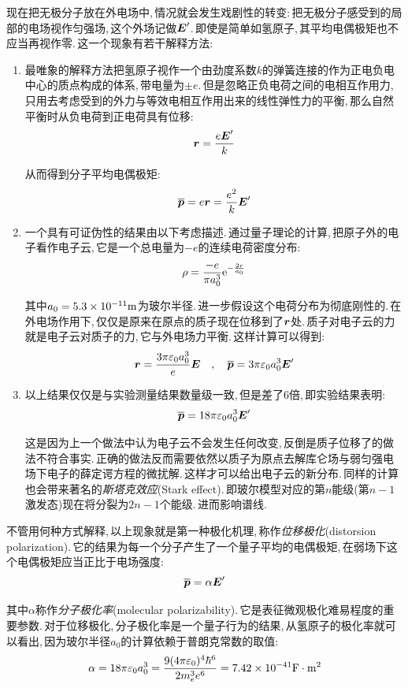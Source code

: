现在把无极分子放在外电场中,\,情况就会发生戏剧性的转变:\,把无极分子感受到的局部的电场视作匀强场,\,这个外场记做$\boldsymbol{E}'$.\,即使是简单如氢原子,\,其平均电偶极矩也不应当再视作零.\,这一个现象有若干解释方法:

\begin{enumerate}
\item 最唯象的解释方法把氢原子视作一个由劲度系数$k$的弹簧连接的作为正电负电中心的质点构成的体系,\,带电量为$\pm e$.\,但是忽略正负电荷之间的电相互作用力,\,只用去考虑受到的外力与等效电相互作用出来的线性弹性力的平衡,\,那么自然平衡时从负电荷到正电荷具有位移:
\[\boldsymbol{r}=\frac{e\boldsymbol{E}'}{k}\]

从而得到分子平均电偶极矩:
\[\overline{\boldsymbol{p}}=e\boldsymbol{r}=\frac{e^2}{k}\boldsymbol{E}'\]

\item 一个具有可证伪性的结果由以下考虑描述.\,通过量子理论的计算,\,把原子外的电子看作电子云,\,它是一个总电量为$-e$的连续电荷密度分布:
$$
\rho =\frac{-e}{\pi a_{0}^{3}}{\rm e}^{-\frac{2r}{a_0}}
$$

其中$a_0=5.3\times 10^{-11}{\rm m}$为玻尔半径.\,进一步假设这个电荷分布为彻底刚性的.\,在外电场作用下,\,仅仅是原来在原点的质子现在位移到了$\boldsymbol{r}$处.\,质子对电子云的力就是电子云对质子的力,\,它与外电场力平衡.\,这样计算可以得到:
\[\boldsymbol{r}=\frac{3\pi\varepsilon_0 a_0^3}{e}\boldsymbol{E}\quad ,\quad \overline{\boldsymbol{p}}=3\pi\varepsilon_0 a_0^3\boldsymbol{E}'\]

\item 以上结果仅仅是与实验测量结果数量级一致,\,但是差了$6$倍,\,即实验结果表明:
\[\overline{\boldsymbol{p}}=18\pi\varepsilon_0 a_0^3\boldsymbol{E}'\]

这是因为上一个做法中认为电子云不会发生任何改变,\,反倒是质子位移了的做法不符合事实.\,正确的做法反而需要依然以质子为原点去解库仑场与弱匀强电场下电子的薛定谔方程的微扰解.\,这样才可以给出电子云的新分布.\,同样的计算也会带来著名的\emph{斯塔克效应}(Stark effect).\,即玻尔模型对应的第$n$能级(第$n-1$激发态)现在将分裂为$2n-1$个能级.\,进而影响谱线.

\end{enumerate}

不管用何种方式解释,\,以上现象就是第一种极化机理,\,称作\emph{位移极化}(distorsion polarization).\,它的结果为每一个分子产生了一个量子平均的电偶极矩,\,在弱场下这个电偶极矩应当正比于电场强度:
\[\overline{\boldsymbol{p}}=\alpha \boldsymbol{E}'\]

其中$\alpha$称作\emph{分子极化率}(molecular polarizability).\,它是表征微观极化难易程度的重要参数.\,对于位移极化,\,分子极化率是一个量子行为的结果,\,从氢原子的极化率就可以看出,\,因为玻尔半径$a_0$的计算依赖于普朗克常数的取值:
\[\alpha =18\pi\varepsilon_0 a_0^3=\frac{9(4\pi\varepsilon_0)^4\hbar^6}{2m_e^3e^6}=7.42\times 10^{-41} {\rm F\cdot m^2}\]
\vspace{1cm}

